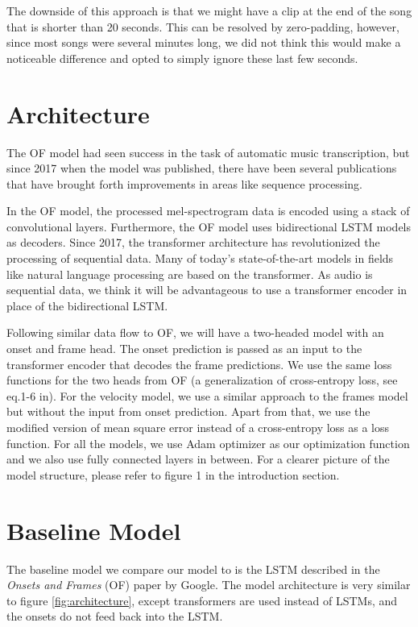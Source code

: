 \documentclass[a4paper,twocolumn,10pt]{article}
\begin{document}
The downside of this approach is that we might have a clip at the end of the song that is shorter than 20 seconds. This can be resolved by zero-padding, however, since most songs were several minutes long, we did not think this would make a noticeable difference and opted to simply ignore these last few seconds.
\section{Architecture}
The OF model\cite{onsets_and_frames} had seen success in the task of automatic music transcription, but since 2017 when the model was published, there have been several publications that have brought forth improvements in areas like sequence processing.

In the OF model, the processed mel-spectrogram data is encoded using a stack of convolutional layers\cite{rainer}. Furthermore, the OF model uses bidirectional LSTM models as decoders. Since 2017, the transformer architecture has revolutionized the processing of sequential data\cite{attention}. Many of today’s state-of-the-art models in fields like natural language processing are based on the transformer. As audio is sequential data, we think it will be advantageous to use a transformer encoder in place of the bidirectional LSTM.

Following similar data flow to OF, we will have a two-headed model with an onset and frame head. The onset prediction is passed as an input to the transformer encoder that decodes the frame predictions. We use the same loss functions for the two heads from OF (a generalization of cross-entropy loss, see eq.1-6 in\cite{onsets_and_frames}). For the velocity model, we use a similar approach to the frames model but without the input from onset prediction. Apart from that, we use the modified version of mean square error instead of a cross-entropy loss as a loss function. For all the models, we use Adam optimizer as our optimization function and we also use fully connected layers in between. For a clearer picture of the model structure, please refer to figure 1 in the introduction section.

\section{Baseline Model}
The baseline model we compare our model to is the LSTM described in the \textit{Onsets and Frames} (OF) paper by Google\cite{onsets_and_frames}. The model architecture is very similar to figure \ref{fig:architecture}, except transformers are used instead of LSTMs, and the onsets do not feed back into the LSTM.
\end{document}
